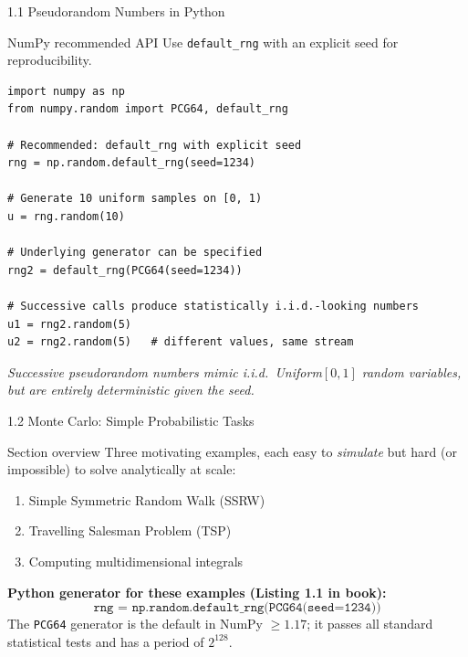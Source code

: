 \documentclass[aspectratio=169,10pt]{beamer}
\begin{document}
\begin{frame}[fragile]{1.1 Pseudorandom Numbers in Python}

  \begin{block}{NumPy recommended API}
    Use \texttt{default\_rng} with an explicit seed for reproducibility.
  \end{block}

\begin{lstlisting}[style=python, caption={Initialising a PRNG (Book, Sec.~1.2 intro)}]
import numpy as np
from numpy.random import PCG64, default_rng

# Recommended: default_rng with explicit seed
rng = np.random.default_rng(seed=1234)

# Generate 10 uniform samples on [0, 1)
u = rng.random(10)

# Underlying generator can be specified
rng2 = default_rng(PCG64(seed=1234))

# Successive calls produce statistically i.i.d.-looking numbers
u1 = rng2.random(5)
u2 = rng2.random(5)   # different values, same stream
\end{lstlisting}

  \textit{Successive pseudorandom numbers mimic i.i.d.\ Uniform$[0,1]$
  random variables, but are entirely deterministic given the seed.}

\end{frame}

\begin{frame}[allowframebreaks]{1.2 Monte Carlo: Simple Probabilistic Tasks}

  \begin{block}{Section overview}
    Three motivating examples, each easy to \emph{simulate} but hard
    (or impossible) to solve analytically at scale:
    \begin{enumerate}
      \item Simple Symmetric Random Walk (SSRW)
      \item Travelling Salesman Problem (TSP)
      \item Computing multidimensional integrals
    \end{enumerate}
  \end{block}

  \bigskip
  \textbf{Python generator for these examples (Listing 1.1 in book):}
  \[
    \texttt{rng = np.random.default\_rng(PCG64(seed=1234))}
  \]
  The \texttt{PCG64} generator is the default in NumPy $\ge 1.17$; it passes
  all standard statistical tests and has a period of $2^{128}$.

\end{frame}
\end{document}
